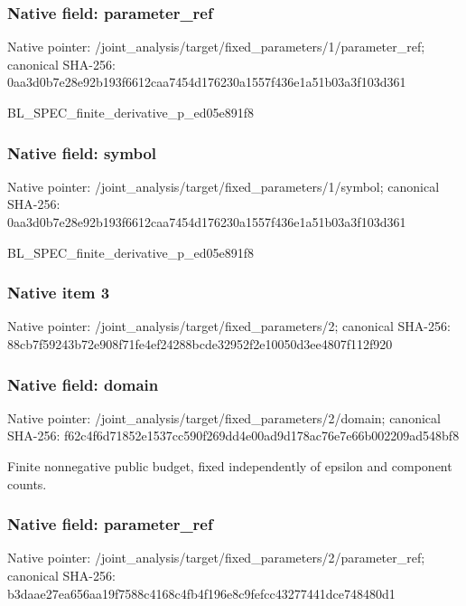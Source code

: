 \documentclass[10pt,a4paper]{article}
\begin{document}
\subsubsection{Native field: parameter\_\allowbreak{}ref}
Native pointer: /joint\_\allowbreak{}analysis/target/fixed\_\allowbreak{}parameters/1/parameter\_\allowbreak{}ref; canonical SHA-256: 0aa3d0b7e28e92b193f6612caa7454d176230a1557f436e1a51b03a3f103d361

\begingroup\raggedright\sloppy BL\_\allowbreak{}SPEC\_\allowbreak{}finite\_\allowbreak{}derivative\_\allowbreak{}p\_\allowbreak{}ed05e891f8\par\endgroup

\subsubsection{Native field: symbol}
Native pointer: /joint\_\allowbreak{}analysis/target/fixed\_\allowbreak{}parameters/1/symbol; canonical SHA-256: 0aa3d0b7e28e92b193f6612caa7454d176230a1557f436e1a51b03a3f103d361

\begingroup\raggedright\sloppy BL\_\allowbreak{}SPEC\_\allowbreak{}finite\_\allowbreak{}derivative\_\allowbreak{}p\_\allowbreak{}ed05e891f8\par\endgroup

\subsubsection{Native item 3}
Native pointer: /joint\_\allowbreak{}analysis/target/fixed\_\allowbreak{}parameters/2; canonical SHA-256: 88cb7f59243b72e908f71fe4ef24288bcde32952f2e10050d3ee4807f112f920

\subsubsection{Native field: domain}
Native pointer: /joint\_\allowbreak{}analysis/target/fixed\_\allowbreak{}parameters/2/domain; canonical SHA-256: f62c4f6d71852e1537cc590f269dd4e00ad9d178ac76e7e66b002209ad548bf8

\begingroup\raggedright\sloppy Finite nonnegative public budget,\allowbreak{} fixed independently of epsilon and component counts.\par\endgroup

\subsubsection{Native field: parameter\_\allowbreak{}ref}
Native pointer: /joint\_\allowbreak{}analysis/target/fixed\_\allowbreak{}parameters/2/parameter\_\allowbreak{}ref; canonical SHA-256: b3daae27ea656aa19f7588c4168c4fb4f196e8c9fefcc43277441dce748480d1
\end{document}
